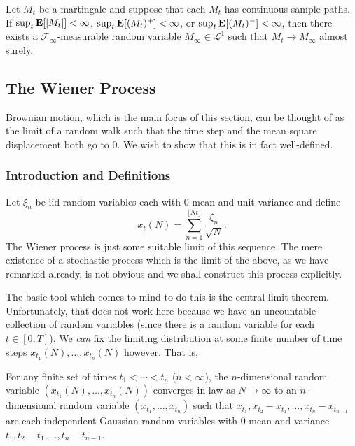 \begin{theorem}
	Let $M_t$ be a martingale and suppose that each $M_t$ has continuous sample paths. If $\sup_t\textbf{E}[|M_t|]<\infty$, $\sup_t\textbf{E}[(M_t)^+]<\infty$, or $\sup_t \textbf{E}[(M_t)^-]<\infty$, then there exists a $\mathcal{F}_\infty$-measurable random variable $M_\infty\in\mathcal{L}^1$ such that $M_t\to M_\infty$ almost surely.
\end{theorem}

\subsection{The Wiener Process}

Brownian motion, which is the main focus of this section, can be thought of as the limit of a random walk such that the time step and the mean square displacement both go to $0$. We wish to show that this is in fact well-defined.

\subsubsection{Introduction and Definitions}

Let $\xi_n$ be iid random variables each with $0$ mean and unit variance and define
\begin{equation}
	\label{eqn: donsker wiener}
	x_t(N) = \sum_{n=1}^{\lfloor Nt\rfloor} \frac{\xi_n}{\sqrt{N}}.
\end{equation}
The Wiener process is just some suitable limit of this sequence. The mere existence of a stochastic process which is the limit of the above, as we have remarked already, is not obvious and we shall construct this process explicitly.

The basic tool which comes to mind to do this is the central limit theorem. Unfortunately, that does not work here because we have an uncountable collection of random variables (since there is a random variable for each $t\in[0,T]$). We \textit{can} fix the limiting distribution at some finite number of time steps $x_{t_1}(N),\ldots,x_{t_n}(N)$ however. That is,

\begin{lemma}
	\label{finite wiener}
	For any finite set of times $t_1<\cdots<t_n$ ($n<\infty$), the $n$-dimensional random variable $(x_{t_1}(N),\ldots,x_{t_n}(N))$ converges in law as $N\to\infty$ to an $n$-dimensional random variable $(x_{t_1},\ldots,x_{t_n})$ such that $x_{t_1}, x_{t_2}-x_{t_1},\ldots,x_{t_n}-x_{t_{n-1}}$ are each independent Gaussian random variables with $0$ mean and variance $t_1,t_2-t_1,\ldots,t_{n}-t_{n-1}$.
\end{lemma}

